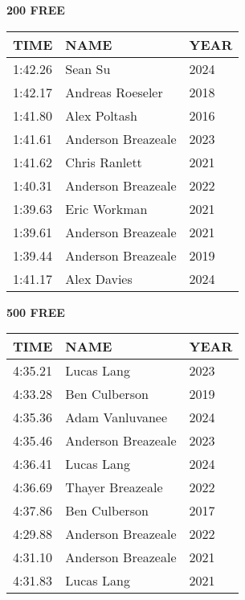 \begin{minipage}[t]{0.48\textwidth}
\centering
\textbf{200 FREE}\\[0.05cm]
\begin{tabular}{@{}p{1.8cm}p{2.8cm}p{1.2cm}@{}}
\hline
\textbf{TIME} & \textbf{NAME} & \textbf{YEAR} \\
\hline
1:42.26 & Sean Su & 2024 \\
1:42.17 & Andreas Roeseler & 2018 \\
1:41.80 & Alex Poltash & 2016 \\
1:41.61 & Anderson Breazeale & 2023 \\
1:41.62 & Chris Ranlett & 2021 \\
1:40.31 & Anderson Breazeale & 2022 \\
1:39.63 & Eric Workman & 2021 \\
1:39.61 & Anderson Breazeale & 2021 \\
1:39.44 & Anderson Breazeale & 2019 \\
1:41.17 & Alex Davies & 2024 \\
\hline
\end{tabular}
\end{minipage}\hfill
\begin{minipage}[t]{0.48\textwidth}
\centering
\textbf{500 FREE}\\[0.05cm]
\begin{tabular}{@{}p{1.8cm}p{2.8cm}p{1.2cm}@{}}
\hline
\textbf{TIME} & \textbf{NAME} & \textbf{YEAR} \\
\hline
4:35.21 & Lucas Lang & 2023 \\
4:33.28 & Ben Culberson & 2019 \\
4:35.36 & Adam Vanluvanee & 2024 \\
4:35.46 & Anderson Breazeale & 2023 \\
4:36.41 & Lucas Lang & 2024 \\
4:36.69 & Thayer Breazeale & 2022 \\
4:37.86 & Ben Culberson & 2017 \\
4:29.88 & Anderson Breazeale & 2022 \\
4:31.10 & Anderson Breazeale & 2021 \\
4:31.83 & Lucas Lang & 2021 \\
\hline
\end{tabular}
\end{minipage}

\vspace{0.4cm}

